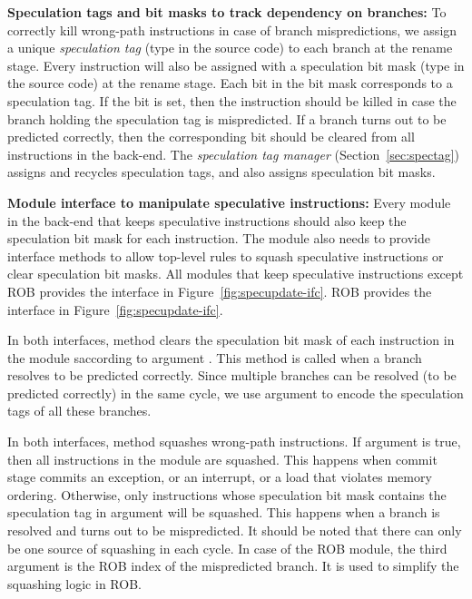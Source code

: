 \noindent\textbf{Speculation tags and bit masks to track dependency on branches:}
To correctly kill wrong-path instructions in case of branch mispredictions, we assign a unique \emph{speculation tag} (type  in the source code) to each branch at the rename stage.
Every instruction will also be assigned with a speculation bit mask (type  in the source code) at the rename stage.
Each bit in the bit mask corresponds to a speculation tag.
If the bit is set, then the instruction should be killed in case the branch holding the speculation tag is mispredicted.
If a branch turns out to be predicted correctly, then the corresponding bit should be cleared from all instructions in the back-end. 
The \emph{speculation tag manager} (Section~\ref{sec:spectag}) assigns and recycles speculation tags, and also assigns speculation bit masks.

\noindent\textbf{Module interface to manipulate speculative instructions:}
Every module in the back-end that keeps speculative instructions should also keep the speculation bit mask for each instruction.
The module also needs to provide interface methods to allow top-level rules to squash speculative instructions or clear speculation bit masks.
All modules that keep speculative instructions except ROB provides the  interface in Figure~\ref{fig:specupdate-ifc}.
ROB provides the  interface in Figure~\ref{fig:specupdate-ifc}.

In both interfaces, method  clears the speculation bit mask of each instruction in the module saccording to argument .
This method is called when a branch resolves to be predicted correctly.
Since multiple branches can be resolved (to be predicted correctly) in the same cycle, we use argument  to encode the speculation tags of all these branches.

In both interfaces, method  squashes wrong-path instructions.
If argument  is true, then all instructions in the module are squashed.
This happens when commit stage commits an exception, or an interrupt, or a load that violates memory ordering.
Otherwise, only instructions whose speculation bit mask contains the speculation tag in argument  will be squashed.
This happens when a branch is resolved and turns out to be mispredicted.
It should be noted that there can only be one source of squashing in each cycle.
In case of the ROB module, the third argument  is the ROB index of the mispredicted branch.
It is used to simplify the squashing logic in ROB.

